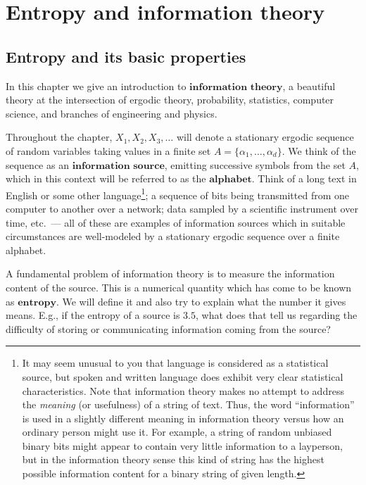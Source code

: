 

\chapter{Entropy and information theory}

\section{Entropy and its basic properties}
In this chapter we give an introduction to
$\textbf{information theory}$, a beautiful theory at
the intersection of ergodic theory, probability,
statistics, computer science, and branches of
engineering and physics.

Throughout the chapter, $X_1,X_2,X_3,\ldots$ will
denote a stationary ergodic sequence of random
variables taking values in a finite set
$A=\{\alpha_1,\ldots,\alpha_d \}$. We think of the
sequence as an $\textbf{information source}$,
emitting successive symbols from the set $A$, which
in this context will be referred to as the
$\textbf{alphabet}$. Think of a long text in English
or some other language\footnote{It may seem unusual to you that language is
considered as a statistical source, but spoken and
written language does exhibit very clear statistical
characteristics. Note that information theory makes no
attempt to address the \emph{meaning} (or usefulness) of a
string of text. Thus, the word ``information'' is used
in a slightly different meaning in information theory
versus how an ordinary person might use it. For
example, a string of random unbiased binary bits might
appear to contain very little information to a
layperson, but in the information theory sense this
kind of string has the highest possible information
content for a binary string of given length.}; a sequence of
bits being transmitted from one computer to another
over a network; data sampled by a scientific
instrument over time, etc.\ --- all of these are
examples of information sources which in suitable
circumstances are well-modeled by a stationary ergodic
sequence over a finite alphabet.

A fundamental problem of information theory is to
measure the information content of the source. This is
a numerical quantity which has come to be known as
$\textbf{entropy}$. We will define it and also try to
explain what the number it gives means. E.g., if the
entropy of a source is $3.5$, what does that tell us
regarding the difficulty of storing or communicating
information coming from the source?

